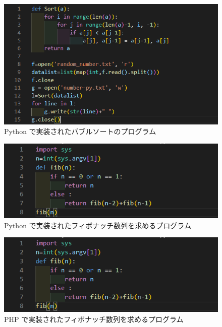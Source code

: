 \begin{figure}[tbp]
    \centering
    \includegraphics[width=13.5cm,keepaspectratio]{figure/b-rb.PNG}
    \caption{Python で実装されたバブルソートのプログラム}
    \label{fig:b-rb}
\end{figure}

\begin{figure}[tbp]
    \centering
    \includegraphics[width=13.5cm,keepaspectratio]{figure/f-py.PNG}
    \caption{Python で実装されたフィボナッチ数列を求めるプログラム}
    \label{fig:f-py}
\end{figure}

\begin{figure}[tbp]
    \centering
    \includegraphics[width=13.5cm,keepaspectratio]{figure/f-py.PNG}
    \caption{PHP で実装されたフィボナッチ数列を求めるプログラム}
    \label{fig:f-php}
\end{figure}

